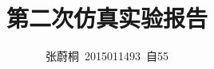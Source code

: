 \documentclass[UTF8,a4paper]{ctexart}
\title{第二次仿真实验报告}
\author{张蔚桐\ 2015011493\ 自55}
\begin{document}
\newcommand{\tabincell}[2]{\begin{tabular}{@{}#1@{}}#2\end{tabular}}
\maketitle
\tableofcontents
\end{document}
